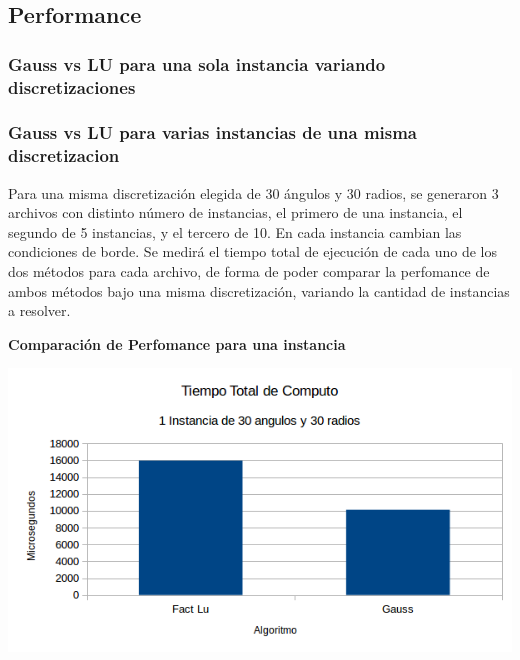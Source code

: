\subsection{Performance}
\subsubsection{Gauss vs LU para una sola instancia variando discretizaciones}
\subsubsection{Gauss vs LU para varias instancias de una misma discretizacion}

Para una misma discretizaci\'on elegida de 30 \'angulos y 30 radios, se generaron 3 archivos con distinto n\'umero de instancias, el primero de una instancia, el segundo de 5 instancias, y el tercero de 10. En cada instancia cambian las condiciones de borde. Se medir\'a el tiempo total de ejecuci\'on de cada uno de los dos m\'etodos para cada archivo, de forma de poder comparar la perfomance de ambos m\'etodos bajo una misma discretizaci\'on, variando la cantidad de instancias a resolver.

\vspace{0.5cm}

  	\textbf{Comparaci\'on de Perfomance para una instancia}\\
\begin{center}
\includegraphics[scale=0.7]{experimentos2a_2b/2bUnaInstancia.png}
\end{center}

